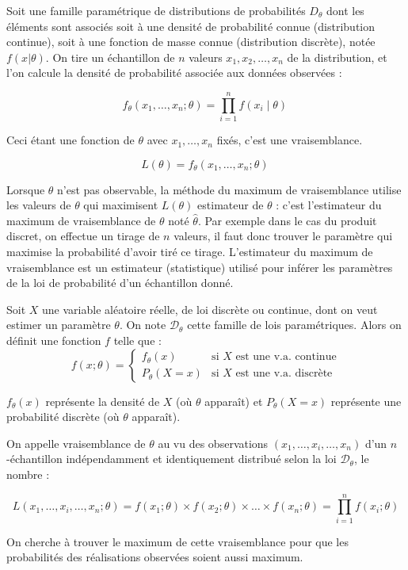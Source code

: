 Soit une famille paramétrique de distributions de probabilités $D_\theta$ dont les éléments sont associés soit à une densité de probabilité connue (distribution continue), soit à une fonction de masse connue (distribution discrète), notée $f(x \vert \theta)$. 
On tire un échantillon de $n$ valeurs $x_1, x_2, \ldots, x_n$ de la distribution, et l'on calcule la densité de probabilité associée aux données observées :

\[ {\displaystyle f_{\theta }(x_{1},\dots ,x_{n};\theta )=\prod _{i=1}^{n}f(x_{i}\mid \theta )\,} \]

Ceci étant une fonction de $\theta$ avec $x_1, \ldots, x_n$  fixés, c'est une vraisemblance.

\[  {\displaystyle L(\theta )=f_{\theta }(x_{1},\dots ,x_{n};\theta )\,} \]

Lorsque $\theta$ n'est pas observable, la méthode du maximum de vraisemblance utilise les valeurs de $\theta$ qui maximisent $L(\theta)$ estimateur de $\theta$ : c'est l'estimateur du maximum de vraisemblance de $\theta$ noté ${\displaystyle {\widehat {\theta }}}$. Par exemple dans le cas du produit discret, on effectue un tirage de $n$ valeurs, il faut donc trouver le paramètre qui maximise la probabilité d'avoir tiré ce tirage.
L'estimateur du maximum de vraisemblance est un estimateur (statistique) utilisé pour inférer les paramètres de la loi de probabilité d'un échantillon donné.

\begin{definition}[EMV]

Soit $X$ une variable aléatoire réelle, de loi discrète ou continue, dont on veut estimer un paramètre $\theta$. On note $ {\mathcal {D}}_{\theta }$ cette famille de lois paramétriques. Alors on définit une fonction $f$ telle que :
  \[
        {\displaystyle f(x;\theta )={\begin{cases}f_{\theta }(x)&{\text{si }}X{\text{ est une v.a. continue}}\\P_{\theta }(X=x)&{\text{si }}X{\text{ est une v.a. discrète}}\end{cases}}} 
  \]

    $ f_{\theta }(x)$ représente la densité de $X$ (où $\theta$ apparaît) et  $P_{\theta }(X=x)$ représente une probabilité discrète (où $\theta$ apparaît).

On appelle vraisemblance de $\theta$ au vu des observations $(x_{1},\ldots ,x_{i},\ldots ,x_{n})$ d'un $n$-échantillon indépendamment et identiquement distribué selon la loi $ {\mathcal {D}}_{\theta }$, le nombre :

    \[  {\displaystyle L(x_{1},\ldots ,x_{i},\ldots ,x_{n};\theta )=f(x_{1};\theta )\times f(x_{2};\theta )\times \ldots \times f(x_{n};\theta )=\prod _{i=1}^{n}f(x_{i};\theta )} \]
\end{definition}
On cherche à trouver le maximum de cette vraisemblance pour que les probabilités des réalisations observées soient aussi maximum.

